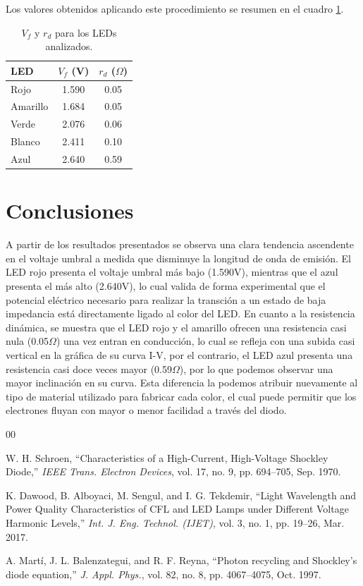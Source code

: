 \documentclass[conference,10pt,letterpaper]{IEEEtran}
\begin{document}
Los valores obtenidos aplicando este procedimiento se resumen en el cuadro \ref{tab:parametros_led}.

\begin{table}[H]
\centering
\caption{$V_f$ y $r_d$ para los LEDs analizados.}
\label{tab:parametros_led}
\begin{tabular}{lcc}
\hline
\textbf{LED} & \textbf{$V_f$ (V)} & \textbf{$r_d$ ($\Omega$)} \\
\hline
Rojo     & 1.590 & 0.05 \\
Amarillo & 1.684 & 0.05 \\
Verde    & 2.076 & 0.06 \\
Blanco   & 2.411 & 0.10 \\
Azul     & 2.640 & 0.59 \\
\hline
\end{tabular}
\end{table}

\section{Conclusiones}

A partir de los resultados presentados se observa una clara tendencia ascendente en el voltaje umbral a medida que disminuye la longitud de onda de emisión. El LED rojo presenta el voltaje umbral más bajo (1.590V), mientras que el azul presenta el más alto (2.640V), lo cual valida de forma experimental que el potencial eléctrico necesario para realizar la transción a un estado de baja impedancia está directamente ligado al color del LED.
En cuanto a la resistencia dinámica, se muestra que el LED rojo y el amarillo ofrecen una resistencia casi nula (0.05$\Omega$) una vez entran en conducción, lo cual se refleja con una subida casi vertical en la gráfica de su curva I-V, por el contrario, el LED azul presenta una resistencia casi doce veces mayor (0.59$\Omega$), por lo que podemos observar una mayor inclinación en su curva. Esta diferencia la podemos atribuir nuevamente al tipo de material utilizado para fabricar cada color, el cual puede permitir que los electrones fluyan con mayor o menor facilidad a través del diodo.


\begin{thebibliography}{00}

 W. H. Schroen, ``Characteristics of a High-Current, High-Voltage Shockley Diode,'' \textit{IEEE Trans. Electron Devices}, vol. 17, no. 9, pp. 694--705, Sep. 1970.

 K. Dawood, B. Alboyaci, M. Sengul, and I. G. Tekdemir, ``Light Wavelength and Power Quality Characteristics of CFL and LED Lamps under Different Voltage Harmonic Levels,'' \textit{Int. J. Eng. Technol. (IJET)}, vol. 3, no. 1, pp. 19--26, Mar. 2017.

 A. Martí, J. L. Balenzategui, and R. F. Reyna, ``Photon recycling and Shockley's diode equation,'' \textit{J. Appl. Phys.}, vol. 82, no. 8, pp. 4067--4075, Oct. 1997.

\end{thebibliography}
\end{document}
